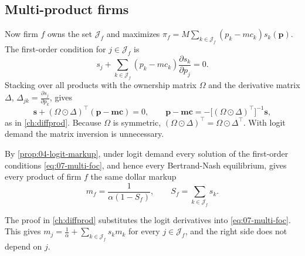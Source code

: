 \subsection{Multi-product firms}\label{sec:07-bertrand-multi}

Now firm $f$ owns the set $\mathcal{J}_f$ and maximizes $\pi_f = M\sum_{k \in \mathcal{J}_f}(p_k - mc_k)s_k(\boldsymbol
p)$. The first-order condition for $j \in \mathcal{J}_f$ is
\begin{equation}\label{eq:07-multi-foc}
  s_j + \sum_{k \in \mathcal{J}_f}(p_k - mc_k)\frac{\partial s_k}{\partial p_j} = 0 .
\end{equation}
Stacking over all products with the ownership matrix $\Omega$ and the derivative matrix $\Delta$, $\Delta_{jk} =
\frac{\partial s_j}{\partial p_k}$, gives
\begin{equation}\label{eq:07-multi-foc-matrix}
  \boldsymbol s + (\Omega \odot \Delta)^\top(\boldsymbol p - \boldsymbol{mc}) = 0, \qquad
  \boldsymbol p - \boldsymbol{mc} = -\bigl[(\Omega \odot \Delta)^\top\bigr]^{-1}\boldsymbol s,
\end{equation}
as in \cref{ch:diffprod}. Because $\Omega$ is symmetric, $(\Omega \odot \Delta)^\top = \Omega \odot \Delta^\top$. With
logit demand the matrix inversion is unnecessary.

\begin{proposition}\label{prop:07-logit-multi}
By \cref{prop:04-logit-markup}, under logit demand every solution of the first-order conditions
\eqref{eq:07-multi-foc}, and hence every Bertrand-Nash equilibrium, gives every product of firm $f$ the same dollar
markup
\begin{equation}\label{eq:07-logit-multi}
  m_f = \frac{1}{\alpha(1 - S_f)}, \qquad S_f = \sum_{k \in \mathcal{J}_f} s_k .
\end{equation}
\end{proposition}

The proof in \cref{ch:diffprod} substitutes the logit derivatives into \eqref{eq:07-multi-foc}. This gives $m_j =
\frac{1}{\alpha} + \sum_{k \in \mathcal{J}_f} s_k m_k$ for every $j \in \mathcal{J}_f$, and the right side does not
depend on $j$.

